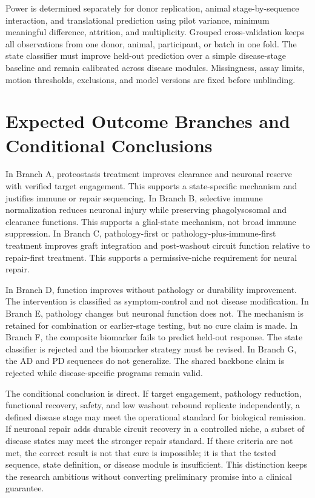 \documentclass[conference]{IEEEtran}
\begin{document}
Power is determined separately for donor replication, animal stage-by-sequence interaction, and translational prediction using pilot variance, minimum meaningful difference, attrition, and multiplicity. Grouped cross-validation keeps all observations from one donor, animal, participant, or batch in one fold. The state classifier must improve held-out prediction over a simple disease-stage baseline and remain calibrated across disease modules. Missingness, assay limits, motion thresholds, exclusions, and model versions are fixed before unblinding.

\section{Expected Outcome Branches and Conditional Conclusions}
In Branch A, proteostasis treatment improves clearance and neuronal reserve with verified target engagement. This supports a state-specific mechanism and justifies immune or repair sequencing. In Branch B, selective immune normalization reduces neuronal injury while preserving phagolysosomal and clearance functions. This supports a glial-state mechanism, not broad immune suppression. In Branch C, pathology-first or pathology-plus-immune-first treatment improves graft integration and post-washout circuit function relative to repair-first treatment. This supports a permissive-niche requirement for neural repair.

In Branch D, function improves without pathology or durability improvement. The intervention is classified as symptom-control and not disease modification. In Branch E, pathology changes but neuronal function does not. The mechanism is retained for combination or earlier-stage testing, but no cure claim is made. In Branch F, the composite biomarker fails to predict held-out response. The state classifier is rejected and the biomarker strategy must be revised. In Branch G, the AD and PD sequences do not generalize. The shared backbone claim is rejected while disease-specific programs remain valid.

The conditional conclusion is direct. If target engagement, pathology reduction, functional recovery, safety, and low washout rebound replicate independently, a defined disease stage may meet the operational standard for biological remission. If neuronal repair adds durable circuit recovery in a controlled niche, a subset of disease states may meet the stronger repair standard. If these criteria are not met, the correct result is not that cure is impossible; it is that the tested sequence, state definition, or disease module is insufficient. This distinction keeps the research ambitious without converting preliminary promise into a clinical guarantee.
\end{document}
